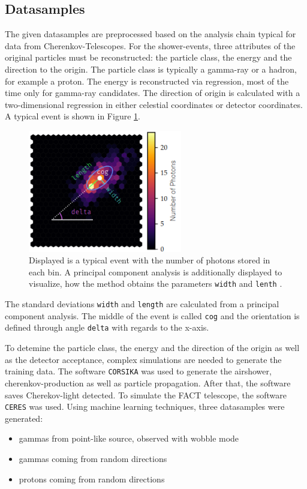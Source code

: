 \subsection{Datasamples}
The given datasamples are preprocessed based on the analysis chain typical for data from Cherenkov-Telescopes.
For the shower-events, three attributes of the original particles must be reconstructed: the particle class, the energy and the direction to the origin.
The particle class is typically a gamma-ray or a hadron, for example a proton. The energy is reconstructed via 
regression, most of the time only for gamma-ray candidates. The direction of origin is calculated with a two-dimensional regression in 
either celestial coordinates or detector coordinates.
A typical event is shown in Figure \ref{fig:event}.
\begin{figure}[H]
  \centering
  \includegraphics[width=0.6\textwidth]{fact_pics/event.png}
  \caption{Displayed is a typical event with the number of photons stored in each bin. A principal component analysis is additionally displayed to 
  visualize, how the method obtains the parameters \texttt{width} and \texttt{lenth} \cite{ANLEITUNG}.}
  \label{fig:event}
\end{figure}
The standard deviations \texttt{width} and \texttt{length} are calculated from a principal component analysis. 
The middle of the event is called \texttt{cog} and the orientation is defined through angle \texttt{delta} with regards to the x-axis.

To detemine the particle class, the energy and the direction of the origin as well as the detector acceptance, complex simulations are needed to generate 
the training data.
The software \texttt{CORSIKA} was used to generate the airshower, cherenkov-production as well as particle propagation. After that, the software 
saves Cherekov-light detected.
To simulate the FACT telescope, the software \texttt{CERES} was used. Using machine learning techniques, three datasamples were generated:
\begin{itemize}
  \item gammas from point-like source, observed with wobble mode
  \item gammas coming from random directions
  \item protons coming from random directions
\end{itemize}

